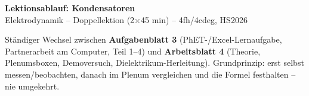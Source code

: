 \documentclass[11pt,a4paper]{article}
\begin{document}
\begin{center}
    {\LARGE \textbf{Lektionsablauf: Kondensatoren}}\\[0.3cm]
    \large Elektrodynamik -- Doppellektion (2$\times$45 min) -- 4fh/4cdeg, HS2026
\end{center}

\vspace{0.2cm}
{\small Ständiger Wechsel zwischen \textbf{Aufgabenblatt 3} (PhET-/Excel-Lernaufgabe,
Partnerarbeit am Computer, Teil 1--4) und \textbf{Arbeitsblatt 4} (Theorie,
Plenumsboxen, Demoversuch, Dielektrikum-Herleitung). Grundprinzip: erst selbst
messen/beobachten, danach im Plenum vergleichen und die Formel festhalten --
nie umgekehrt.}

\vspace{0.3cm}

\renewcommand{\arraystretch}{1.3}
\setlength{\LTpre}{6pt}
\setlength{\LTpost}{6pt}
\end{document}
